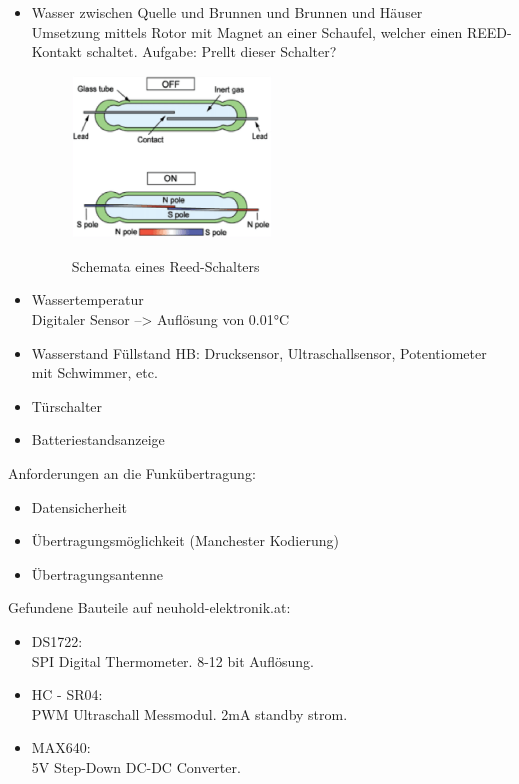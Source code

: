\documentclass[12pt,a4paper]{article}
\begin{document}
\begin{itemize}
	\item{Wasser zwischen Quelle und Brunnen und Brunnen und Häuser} \\
	 Umsetzung mittels Rotor mit Magnet an einer Schaufel, welcher einen
	 REED-Kontakt schaltet. Aufgabe: Prellt dieser Schalter?
	 \begin{figure}[H]
		\centering
		\includegraphics[width=0.5\textwidth]{Reed.png}
		\label{fig:reed}
		\caption{Schemata eines Reed-Schalters}
	\end{figure}

	\item{Wassertemperatur} \\
	Digitaler Sensor --> Auflösung von 0.01°C

	\item{Wasserstand}
	Füllstand HB: Drucksensor, Ultraschallsensor, Potentiometer mit
	Schwimmer, etc.

	\item{Türschalter}
	\item{Batteriestandsanzeige}


\end{itemize}

Anforderungen an die Funkübertragung:
\begin{itemize}
	\item{Datensicherheit}
	\item{Übertragungsmöglichkeit (Manchester Kodierung)}
	\item{Übertragungsantenne}
\end{itemize}

Gefundene Bauteile auf neuhold-elektronik.at:
\begin{itemize}
	\item{DS1722}: \\
	SPI Digital Thermometer. 8-12 bit Auflösung.

	\item{HC - SR04}: \\
	PWM Ultraschall Messmodul. 2mA standby strom.
	
	\item{MAX640}: \\
	5V Step-Down DC-DC Converter.

	
\end{itemize}
\end{document}
